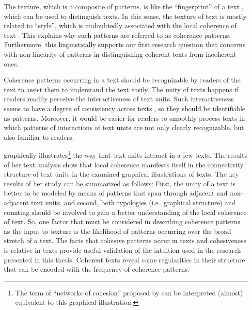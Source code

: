 The texture, which is a composite of patterns, is like the ``fingerprint'' of a text \cite{stoddard91}, which can be used to distinguish texts. 
In this sense, the texture of text is mostly related to ``style'', which is undoubtedly associated with the local coherence of text \cite{barzilay08}. 
This explains why such patterns are referred to as coherence patterns. 
Furthermore, this linguistically supports our first research question that concerns with \mbox{non-linearity} of patterns in distinguishing coherent texts from incoherent ones. 

Coherence patterns occurring in a text should be recognizable by readers of the text to assist them to understand the text easily.  
The unity of texts happens if readers readily perceive the interactiveness of text units.  
Such interactiveness seems to have a degree of consistency across texts \cite{stoddard91}, so they should be identifiable as patterns.  
Moreover, it would be easier for readers to smoothly process texts in which  patterns of interactions of text units are not only clearly recognizable, but also familiar to readers.  
 
 graphically illustrates\footnote{
The term of ``networks of cohesion'' proposed by  can be interpreted (almost) equivalent to this graphical illustration.} the way that text units interact in a few texts. 
The results of her text analysis show that local coherence manifests itself in the connectivity structure of text units in the examined graphical illustrations of texts.  
The key results of her study can be summarized as follows:
First, the unity of a text is better to be modeled by means of patterns that span through adjacent and non-adjacent text units, and second, 
both typologies (i.e.\ graphical structure) and counting should be involved to gain a better understanding of the local coherence of text.  
So, one factor that must be considered in describing coherence patterns as the input to texture is the likelihood of patterns occurring over the broad stretch of a text.  
The facts that cohesive patterns occur in texts and cohesiveness is relative in texts provide useful validation of the intuition used in the research presented in this thesis: Coherent texts reveal some regularities in their structure that can be encoded with the frequency of coherence patterns. 

